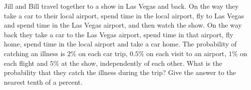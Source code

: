 Jill and Bill travel together to a show in Las Vegas and back. On the way they take a car to their local airport, spend time in the local airport, fly to Las Vegas and spend time in the Las Vegas airport, and then watch the show. On the way back they take a car to the Las Vegas airport, spend time in that airport, fly home, spend time in the local airport and take a car home. The probability of catching an illness is $2\%$ on each car trip, $0.5\%$ on each visit to an airport, $1\%$ on each flight and $5\%$ at the show, independently of each other. What is the probability that they catch the illness during the trip? Give the answer to the nearest tenth of a percent.
